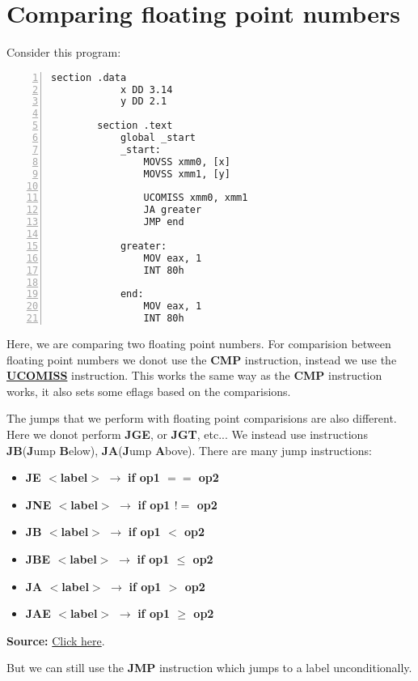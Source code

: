 \documentclass{article}
\makeatletter
\renewcommand\paragraph{\@startsection{paragraph}{4}{\z@}{-3.25ex \@plus -1ex \@minus -.2ex}{1.5ex \@plus .2ex}{\normalfont\normalsize\bfseries}}
\makeatother
\begin{document}
	\section{Comparing floating point numbers}\label{sec:sec1}
	\paragraph{}
	Consider this program:
	
	\begin{Verbatim}[numbers=left, frame=single]
		section .data
			x DD 3.14
			y DD 2.1
			
		section .text
			global _start
			_start:
				MOVSS xmm0, [x]
				MOVSS xmm1, [y]
				
				UCOMISS xmm0, xmm1
				JA greater
				JMP end
				
			greater:
				MOV eax, 1
				INT 80h
				
			end:
				MOV eax, 1
				INT 80h
	\end{Verbatim}

Here, we are comparing two floating point numbers. For comparision between floating point numbers we donot use the \textbf{CMP} instruction, instead we use the \href{https://www.felixcloutier.com/x86/ucomiss}{\textbf{UCOMISS}} instruction. This works the same way as the \textbf{CMP} instruction works, it also sets some eflags based on the comparisions.

\vspace{10pt}
The jumps that we perform with floating point comparisions are also different. Here we donot perform \textbf{JGE}, or \textbf{JGT}, etc... We instead use instructions \textbf{JB}(\textbf{J}ump \textbf{B}elow), \textbf{JA}(\textbf{J}ump \textbf{A}bove).
\newpage
There are many jump instructions:
\begin{itemize}
	\item \textbf{JE $<$label$>$} $\rightarrow$ \textbf{if op1 $==$ op2}
	\item \textbf{JNE $<$label$>$} $\rightarrow$ \textbf{if op1 $!=$ op2}
	\item \textbf{JB $<$label$>$} $\rightarrow$ \textbf{if op1 $<$ op2}
	\item \textbf{JBE $<$label$>$} $\rightarrow$ \textbf{if op1 $\leq$ op2}
	\item \textbf{JA $<$label$>$} $\rightarrow$ \textbf{if op1 $>$ op2}
	\item \textbf{JAE $<$label$>$} $\rightarrow$ \textbf{if op1 $\geq$ op2}
\end{itemize}

\textbf{Source: } \href{https://eng.libretexts.org/Bookshelves/Computer_Science/Programming_Languages/x86-64_Assembly_Language_Programming_with_Ubuntu_(Jorgensen)/18%3A_Floating-Point_Instructions/18.06%3A_Section_6-#:~:text=The%20conditional%20control%20instructions%20include,above%20or%20equal%20(jae).}{Click here}.

But we can still use the \textbf{JMP} instruction which jumps to a label unconditionally.
\end{document}
